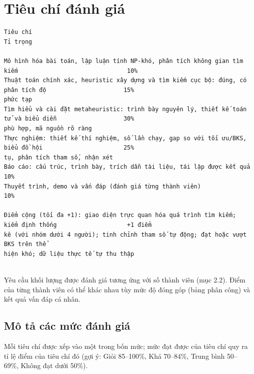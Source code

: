 \documentclass[a4paper,11pt]{article}
\begin{document}
\section{Tiêu chí đánh giá}
\begin{Verbatim}[fontsize=\tiny,breaklines=true,breakanywhere=true]
Tiêu chí                                                                                              Tỉ trọng

Mô hình hóa bài toán, lập luận tính NP-khó, phân tích không gian tìm kiếm                               10%
Thuật toán chính xác, heuristic xây dựng và tìm kiếm cục bộ: đúng, có phân tích độ                      15%
phức tạp
Tìm hiểu và cài đặt metaheuristic: trình bày nguyên lý, thiết kế toán tử và biểu diễn                   30%
phù hợp, mã nguồn rõ ràng
Thực nghiệm: thiết kế thí nghiệm, số lần chạy, gap so với tối ưu/BKS, biểu đồ hội                       25%
tụ, phân tích tham số, nhận xét
Báo cáo: cấu trúc, trình bày, trích dẫn tài liệu, tái lập được kết quả                                  10%
Thuyết trình, demo và vấn đáp (đánh giá từng thành viên)                                                10%

Điểm cộng (tối đa +1): giao diện trực quan hóa quá trình tìm kiếm; kiểm định thống                    +1 điểm
kê (với nhóm dưới 4 người); tinh chỉnh tham số tự động; đạt hoặc vượt BKS trên thể
hiện khó; dữ liệu thực tế tự thu thập


\end{Verbatim}
Yêu cầu khối lượng được đánh giá tương ứng với số thành viên (mục 2.2). Điểm của từng thành viên có thể khác nhau tùy mức độ đóng góp (bảng phân công) và kết quả vấn đáp cá nhân.

\subsection{Mô tả các mức đánh giá}
Mỗi tiêu chí được xếp vào một trong bốn mức; mức đạt được của tiêu chí quy ra tỉ lệ điểm của tiêu chí đó (gợi ý: Giỏi 85–100\%, Khá 70–84\%, Trung bình 50–69\%, Không đạt dưới 50\%).
\end{document}
